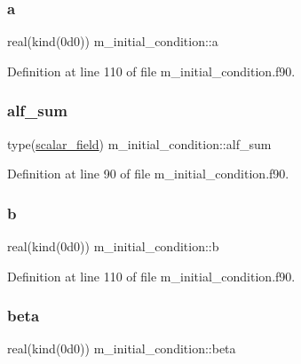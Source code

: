 \subsubsection{\texorpdfstring{a}{a}}
{\footnotesize\ttfamily real(kind(0d0)) m\+\_\+initial\+\_\+condition\+::a}



Definition at line 110 of file m\+\_\+initial\+\_\+condition.\+f90.

\mbox{\label{namespacem__initial__condition_a2fa2c238e1c0c522aeecada3f6cc314d}} 
\subsubsection{\texorpdfstring{alf\+\_\+sum}{alf\_sum}}
{\footnotesize\ttfamily type(\hyperlink{structm__derived__types_1_1scalar__field}{scalar\+\_\+field}) m\+\_\+initial\+\_\+condition\+::alf\+\_\+sum}



Definition at line 90 of file m\+\_\+initial\+\_\+condition.\+f90.

\mbox{\label{namespacem__initial__condition_a0932a1bcb9b0293f1368e204a8fda4b9}} 
\subsubsection{\texorpdfstring{b}{b}}
{\footnotesize\ttfamily real(kind(0d0)) m\+\_\+initial\+\_\+condition\+::b}



Definition at line 110 of file m\+\_\+initial\+\_\+condition.\+f90.

\mbox{\label{namespacem__initial__condition_aa61b446189c2c88bb9261649f4b594b3}} 
\subsubsection{\texorpdfstring{beta}{beta}}
{\footnotesize\ttfamily real(kind(0d0)) m\+\_\+initial\+\_\+condition\+::beta}



